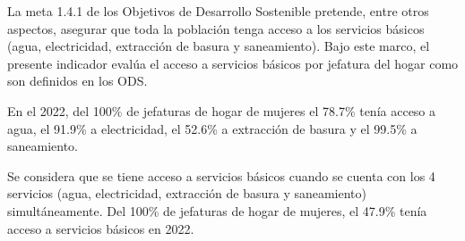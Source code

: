 La meta 1.4.1 de los Objetivos de Desarrollo Sostenible pretende, entre otros aspectos, asegurar que toda la población tenga acceso a los servicios básicos (agua, electricidad, extracción de basura y saneamiento). Bajo este marco, el presente indicador evalúa el acceso a servicios básicos por jefatura del hogar como son definidos en los ODS. 

En el 2022, del 100\% de jefaturas de hogar de mujeres el 78.7\% tenía acceso a agua, el 91.9\% a electricidad, el 52.6\% a extracción de basura y el 99.5\% a saneamiento. 

Se considera que se tiene acceso a servicios básicos cuando se cuenta con los 4 servicios (agua, electricidad, extracción de basura y saneamiento) simultáneamente. Del 100\% de jefaturas de hogar de mujeres, el 47.9\% tenía acceso a servicios básicos en 2022. 